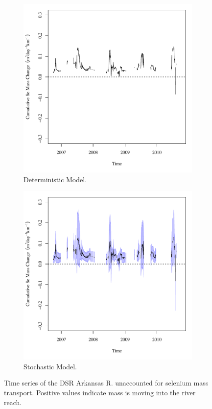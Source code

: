 \begin{linenumbers}
\begin{figure}[htbp]
\centering
	\begin{subfigure}{0.5\textwidth}
		\centering
		\includegraphics[width=0.9\linewidth]{"Figures/Results_DDSR/Balance Mass"}
		\caption{Deterministic Model.}
		\label{sub:DSRMassD}
	\end{subfigure}%
	\begin{subfigure}{0.5\textwidth}
		\centering
		\includegraphics[width=0.9\linewidth]{"Figures/Results_DSR/Balance Mass"}
		\caption{Stochastic Model.}
		\label{sub:DSRMassS}
	\end{subfigure}
	\caption[Time series of the DSR Arkansas R. unaccounted for selenium mass transport.]{Time series of the DSR Arkansas R. unaccounted for selenium mass transport.  Positive values indicate mass is moving into the river reach.}
	\label{fig:DSRMass}
\end{figure}


\end{linenumbers}
